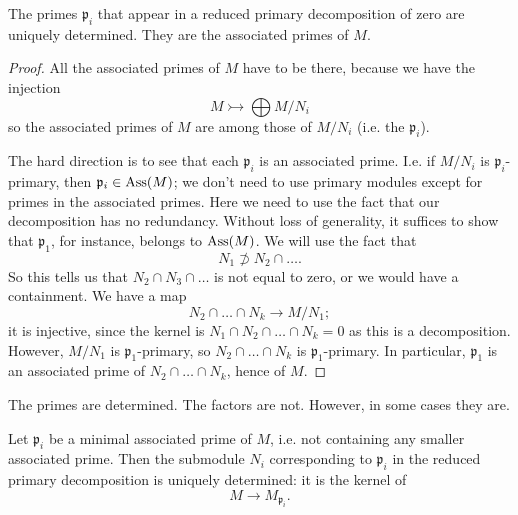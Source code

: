 \begin{proposition} 
The primes $\mathfrak{p}_i$ that appear in a reduced primary decomposition of zero are
uniquely determined. They are the associated primes of $M$.
\end{proposition} 
\begin{proof} 
All the associated primes of $M$ have to be there, because we have the injection
\[ M \rightarrowtail  \bigoplus M/N_i  \]
so the associated primes of $M$ are among those of $M/N_i$ (i.e. the
$\mathfrak{p}_i$).

The hard direction is to see that each $\mathfrak{p}_i$ is an associated prime.
I.e. if $M/N_i$ is $\mathfrak{p}_i$-primary, then $\mathfrak{p}_i \in \operatorname{Ass}(M)$;
we don't need to use primary modules except for primes in the associated primes. 
Here we need to use the fact that our decomposition has no redundancy.  Without
loss of generality, it suffices to show that $\mathfrak{p}_1$, for instance,
belongs to $\operatorname{Ass}(M)$. We will use the fact that
\[ N_1 \not\supset N_2 \cap \dots .  \]
So this tells us that $N_2 \cap N_3 \cap \dots$ is not equal to zero, or we
would have a containment. We have a map
\[ N_2 \cap \dots \cap N_k \to M/N_1;  \]
it is injective, since the kernel is $N_1 \cap N_2 \cap \dots \cap N_k = 0$ as
this is a decomposition.
However, $M/N_1$ is $\mathfrak{p}_1$-primary, so $N_2 \cap \dots \cap N_k$ is
$\mathfrak{p}_1$-primary. In particular, $\mathfrak{p}_1$ is an associated
prime of $N_2 \cap \dots \cap N_k$, hence of  $M$.
\end{proof} 

The primes are determined. The factors are not. However, in some cases they are.

\begin{proposition} 
Let $\mathfrak{p}_i$ be a minimal associated prime of $M$, i.e. not containing
any smaller associated prime. Then the submodule $N_i$  corresponding to
$\mathfrak{p}_i$ in the reduced primary decomposition is uniquely determined:
it is the kernel of 
\[ M \to M_{\mathfrak{p}_i}.  \]
\end{proposition} 

